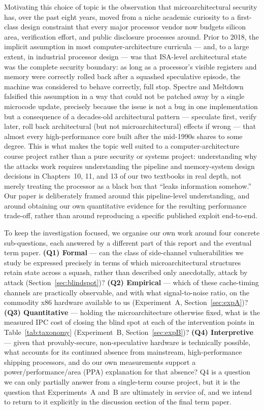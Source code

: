 \documentclass[11pt,a4paper]{article}
\begin{document}
Motivating this choice of topic is the observation that microarchitectural
security has, over the past eight years, moved from a niche academic curiosity
to a first-class design constraint that every major processor vendor now
budgets silicon area, verification effort, and public disclosure processes
around. Prior to 2018, the implicit assumption in most computer-architecture
curricula --- and, to a large extent, in industrial processor design --- was
that ISA-level architectural state was the complete security boundary: as
long as a processor's visible registers and memory were correctly rolled back
after a squashed speculative episode, the machine was considered to behave
correctly, full stop. Spectre and Meltdown falsified this assumption in a way
that could not be patched away by a single microcode update, precisely
because the issue is not a bug in one implementation but a consequence of a
decades-old architectural pattern --- speculate first, verify later, roll
back architectural (but not microarchitectural) effects if wrong --- that
almost every high-performance core built after the mid-1990s shares to some
degree. This is what makes the topic well suited to a computer-architecture
course project rather than a pure security or systems project: understanding
why the attacks work requires understanding the pipeline and memory-system
design decisions in Chapters~10, 11, and 13 of our two textbooks in real
depth, not merely treating the processor as a black box that ``leaks
information somehow.'' Our paper is deliberately framed around this
pipeline-level understanding, and around obtaining our own quantitative
evidence for the resulting performance trade-off, rather than around
reproducing a specific published exploit end-to-end.

To keep the investigation focused, we organise our own work around four
concrete sub-questions, each answered by a different part of this report and
the eventual term paper. \textbf{(Q1) Formal} --- can the class of
side-channel vulnerabilities we study be expressed precisely in terms of
which microarchitectural structures retain state across a squash, rather than
described only anecdotally, attack by attack (Section~\ref{sec:blindspot})?
\textbf{(Q2) Empirical} --- which of these cache-timing channels are
practically observable, and with what signal-to-noise ratio, on the
commodity x86 hardware available to us (Experiment~A,
Section~\ref{sec:expA})? \textbf{(Q3) Quantitative} --- holding the
microarchitecture otherwise fixed, what is the measured IPC cost of closing
the blind spot at each of the intervention points in Table~\ref{tab:taxonomy}
(Experiment~B, Section~\ref{sec:expB})? \textbf{(Q4) Interpretive} --- given
that provably-secure, non-speculative hardware is technically possible, what
accounts for its continued absence from mainstream, high-performance shipping
processors, and do our own measurements support a power/performance/area
(PPA) explanation for that absence? Q4 is a question we can only partially
answer from a single-term course project, but it is the question that
Experiments~A and~B are ultimately in service of, and we intend to return to
it explicitly in the discussion section of the final term paper.
\end{document}
